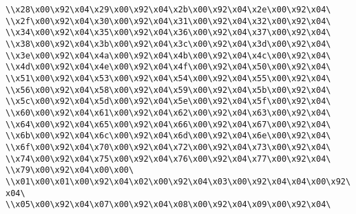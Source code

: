 \verb|\\x28\x00\x92\x04\x29\x00\x92\x04\x2b\x00\x92\x04\x2e\x00\x92\x04\|\newline
\verb|\\x2f\x00\x92\x04\x30\x00\x92\x04\x31\x00\x92\x04\x32\x00\x92\x04\|\newline
\verb|\\x34\x00\x92\x04\x35\x00\x92\x04\x36\x00\x92\x04\x37\x00\x92\x04\|\newline
\verb|\\x38\x00\x92\x04\x3b\x00\x92\x04\x3c\x00\x92\x04\x3d\x00\x92\x04\|\newline
\verb|\\x3e\x00\x92\x04\x4a\x00\x92\x04\x4b\x00\x92\x04\x4c\x00\x92\x04\|\newline
\verb|\\x4d\x00\x92\x04\x4e\x00\x92\x04\x4f\x00\x92\x04\x50\x00\x92\x04\|\newline
\verb|\\x51\x00\x92\x04\x53\x00\x92\x04\x54\x00\x92\x04\x55\x00\x92\x04\|\newline
\verb|\\x56\x00\x92\x04\x58\x00\x92\x04\x59\x00\x92\x04\x5b\x00\x92\x04\|\newline
\verb|\\x5c\x00\x92\x04\x5d\x00\x92\x04\x5e\x00\x92\x04\x5f\x00\x92\x04\|\newline
\verb|\\x60\x00\x92\x04\x61\x00\x92\x04\x62\x00\x92\x04\x63\x00\x92\x04\|\newline
\verb|\\x64\x00\x92\x04\x65\x00\x92\x04\x66\x00\x92\x04\x67\x00\x92\x04\|\newline
\verb|\\x6b\x00\x92\x04\x6c\x00\x92\x04\x6d\x00\x92\x04\x6e\x00\x92\x04\|\newline
\verb|\\x6f\x00\x92\x04\x70\x00\x92\x04\x72\x00\x92\x04\x73\x00\x92\x04\|\newline
\verb|\\x74\x00\x92\x04\x75\x00\x92\x04\x76\x00\x92\x04\x77\x00\x92\x04\|\newline
\verb|\\x79\x00\x92\x04\x00\x00\|\newline
\verb|\\x01\x00\x01\x00\x92\x04\x02\x00\x92\x04\x03\x00\x92\x04\x04\x00\x92\x04\|\newline
\verb|\\x05\x00\x92\x04\x07\x00\x92\x04\x08\x00\x92\x04\x09\x00\x92\x04\|\newline
